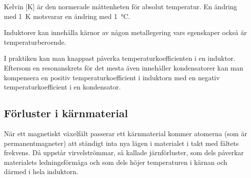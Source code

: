 Kelvin [K] är den normerade måttenheten för absolut temperatur.
En ändring med \SI{1}{\kelvin} motsvarar en ändring med \SI{1}{\degreeCelsius}.

Induktorer kan innehålla kärnor av någon metallegering vars egenskaper också är
temperaturberoende.

I praktiken kan man knappast påverka temperaturkoefficienten i en induktor.
Eftersom en resonanskrets för det mesta även innehåller kondensatorer kan
man kompensera en positiv temperaturkoefficient i induktorn med en negativ
temperaturkoefficient i en kondensator.

\subsection{Förluster i kärnmaterial}

När ett magnetiskt växelfält passerar ett kärnmaterial kommer atomerna (som
är permanentmagneter) att ständigt inta nya lägen i materialet i takt med
fältets frekvens. Då uppstår virvelströmmar, så kallade järnförluster, som dels
påverkar materialets ledningsförmåga och som dels höjer temperaturen i kärnan 
och därmed i hela induktorn.
